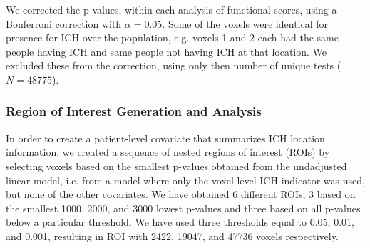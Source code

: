 \documentclass[10pt]{article}\usepackage[]{graphicx}\usepackage[]{color}
\begin{document}
We corrected the p-values, within each analysis of functional scores, using a Bonferroni correction with $\alpha = 0.05$.  Some of the voxels were identical for presence for ICH over the population, e.g. voxels 1 and 2 each had the same people having ICH and same people not having ICH at that location.  We excluded these from the correction, using only then number of unique tests ($N=48775$).

\subsubsection{Region of Interest Generation and Analysis}



In order to create a patient-level covariate that summarizes ICH location information, we created a sequence of nested regions of interest (ROIs) by selecting voxels based on the smallest p-values obtained from the undadjusted linear model, i.e. from a model where only the voxel-level ICH indicator was used, but none of the other covariates.  
We have obtained 6 different ROIs, 3 based on the smallest 1000, 2000, and 3000 lowest p-values and three based on all p-values below a particular threshold. We have used three thresholds equal to 0.05, 0.01, and 0.001, resulting in ROI with 2422, 19047, and 47736 voxels respectively.
\end{document}
